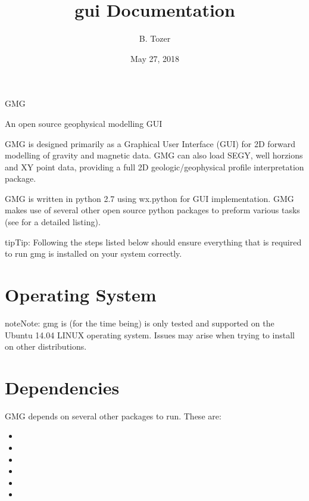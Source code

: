 \documentclass[a4paper,12pt,english]{sphinxmanual}
\title{gui Documentation}
\date{May 27, 2018}
\author{B. Tozer}
\begin{document}
\maketitle
\sphinxtableofcontents
{}\label{\detokenize{documentation_home::doc}}


GMG

An open source geophysical modelling GUI



GMG is designed primarily as a Graphical User Interface (GUI) for 2D forward modelling of gravity and magnetic data.
GMG can also load SEGY, well horzions and XY point data, providing a full 2D geologic/geophysical profile interpretation
package.

GMG is written in python 2.7 using wx.python for GUI implementation. GMG makes use of several other open source python
packages to preform various tasks (see  for a detailed listing).





\begin{sphinxadmonition}{tip}{Tip:}
Following the steps listed below should ensure everything that is required to run gmg is installed on your system correctly.
\end{sphinxadmonition}


\chapter{Operating System}
\label{\detokenize{installation:id1}}\label{\detokenize{installation::doc}}\label{\detokenize{installation:operating-system}}\label{\detokenize{installation:installation}}
\begin{sphinxadmonition}{note}{Note:}
gmg is (for the time being) is only tested and supported on the Ubuntu 14.04 LINUX operating system.
Issues may arise when trying to install on other distributions.
\end{sphinxadmonition}


\chapter{Dependencies}
\label{\detokenize{installation:dependencies}}
GMG depends on several other packages to run. These are:
\begin{itemize}
\item {} 

\item {} 

\item {} 

\item {} 

\item {} 

\item {} 

\end{itemize}
\end{document}
